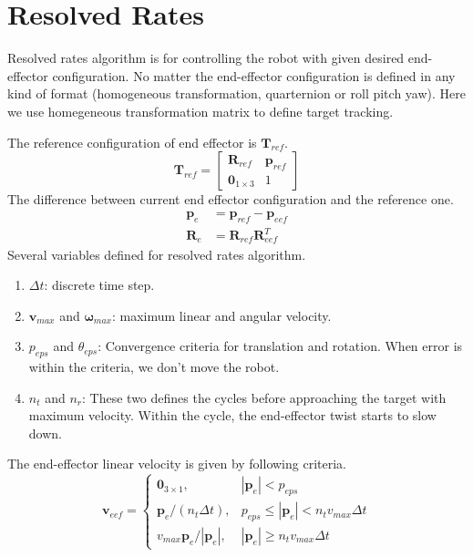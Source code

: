 \documentclass{article}
\begin{document}
\section{Resolved Rates}
Resolved rates algorithm is for controlling the robot with given desired end-effector configuration. No matter the end-effector configuration is defined in any kind of format (homogeneous transformation, quarternion or roll pitch yaw). Here we use homegeneous transformation matrix to define target tracking.

The reference configuration of end effector is $\mathbf{T}_{ref}$.
\begin{equation}
\mathbf{T}_{ref} = \begin{bmatrix}\mathbf{R}_{ref} & \mathbf{p}_{ref} \\ \mathbf{0}_{1\times3} & 1\end{bmatrix}
\end{equation}
The difference between current end effector configuration and the reference one.
\begin{equation}
\begin{split}
\mathbf{p}_{e} & = \mathbf{p}_{ref} - \mathbf{p}_{eef}\\
\mathbf{R}_{e} & = \mathbf{R}_{ref}  \mathbf{R}_{eef}^T
\end{split}
\end{equation}
Several variables defined for resolved rates algorithm.
\begin{enumerate}
\item $\Delta t$: discrete time step.
\item $\mathbf{v}_{max}$ and $\boldsymbol{\omega}_{max}$: maximum linear and angular velocity.
\item $p_{eps}$ and $\theta_{eps}$: Convergence criteria for translation and rotation. When error is within the criteria, we don't move the robot.
\item $n_t$ and $n_r$: These two defines the cycles before approaching the target with maximum velocity. Within the cycle, the end-effector twist starts to slow down.
\end{enumerate}
The end-effector linear velocity is given by following criteria.
\begin{equation}
\mathbf{v}_{eef} = \left\{\begin{matrix}
\mathbf{0}_{3\times1}, & |\mathbf{p}_{e} | < p_{eps} \\ 
\mathbf{p}_{e}/(n_t \Delta t), & p_{eps} \leqslant |\mathbf{p}_{e} | < n_t v_{max} \Delta t\\ 
v_{max} \mathbf{p}_e / |\mathbf{p}_e|, & |\mathbf{p}_{e} | \geqslant n_t v_{max} \Delta t
\end{matrix}\right.
\end{equation}
\end{document}
